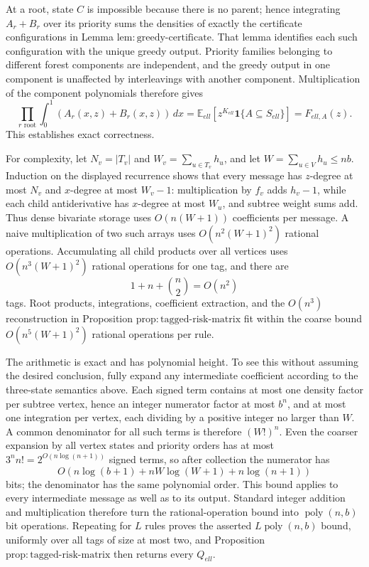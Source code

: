 At a root, state \(C\) is impossible because there is no parent; hence integrating \(A_r+B_r\) over its priority sums the densities of exactly the certificate configurations in Lemma \(\mathrm{lem:greedy\mbox{-}certificate}\).  That lemma identifies each such configuration with the unique greedy output.  Priority families belonging to different forest components are independent, and the greedy output in one component is unaffected by interleavings with another component.  Multiplication of the component polynomials therefore gives
\[
 \prod_{r\text{ root}}\int_0^1(A_r(x,z)+B_r(x,z))\,dx
 =\mathbb E_{ell}[z^{K_{ell}}\mathbf 1\{A\subseteq S_{ell}\}]
 =F_{ell,A}(z).
\]
This establishes exact correctness.

For complexity, let \(N_v=|T_v|\) and \(W_v=\sum_{u\in T_v}h_u\), and let \(W=\sum_{u\in V}h_u\le nb\).  Induction on the displayed recurrence shows that every message has \(z\)-degree at most \(N_v\) and \(x\)-degree at most \(W_v-1\): multiplication by \(f_v\) adds \(h_v-1\), while each child antiderivative has \(x\)-degree at most \(W_u\), and subtree weight sums add.  Thus dense bivariate storage uses \(O(n(W+1))\) coefficients per message.  A naive multiplication of two such arrays uses \(O(n^2(W+1)^2)\) rational operations.  Accumulating all child products over all vertices uses \(O(n^3(W+1)^2)\) rational operations for one tag, and there are
\[
 1+n+\binom n2=O(n^2)
\]
tags.  Root products, integrations, coefficient extraction, and the \(O(n^3)\) reconstruction in Proposition \(\mathrm{prop:tagged\mbox{-}risk\mbox{-}matrix}\) fit within the coarse bound \(O(n^5(W+1)^2)\) rational operations per rule.

The arithmetic is exact and has polynomial height.  To see this without assuming the desired conclusion, fully expand any intermediate coefficient according to the three-state semantics above.  Each signed term contains at most one density factor per subtree vertex, hence an integer numerator factor at most \(b^n\), and at most one integration per vertex, each dividing by a positive integer no larger than \(W\).  A common denominator for all such terms is therefore \((W!)^n\).  Even the coarser expansion by all vertex states and priority orders has at most \(3^n n!=2^{O(n\log(n+1))}\) signed terms, so after collection the numerator has
\[
 O\!\left(n\log(b+1)+nW\log(W+1)+n\log(n+1)\right)
\]
bits; the denominator has the same polynomial order.  This bound applies to every intermediate message as well as to its output.  Standard integer addition and multiplication therefore turn the rational-operation bound into \(\operatorname{poly}(n,b)\) bit operations.  Repeating for \(L\) rules proves the asserted \(L\operatorname{poly}(n,b)\) bound, uniformly over all tags of size at most two, and Proposition \(\mathrm{prop:tagged\mbox{-}risk\mbox{-}matrix}\) then returns every \(Q_{ell}\).

